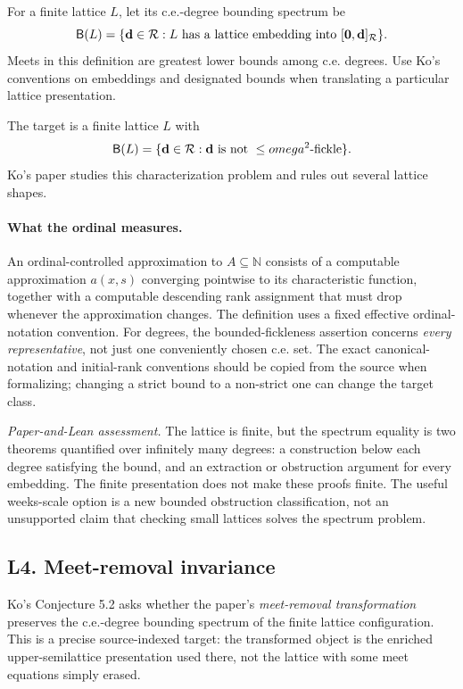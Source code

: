 \documentclass[11pt,a4paper]{article}
\newcommand{\N}{\mathbb N}
\newcommand{\R}{\mathcal R}
\newcommand{\zero}{\mathbf0}
\newcommand{\assessment}[1]{\par\noindent\textit{Paper-and-Lean assessment.} #1\par}
\theoremstyle{definition}\newtheorem{definition}[theorem]{Definition}
\theoremstyle{remark}\newtheorem{remark}[theorem]{Remark}
\begin{document}
For a finite lattice $L$, let its c.e.-degree bounding spectrum be
\[
 \mathsf B(L)=\{\ddeg\in\R:
       L\text{ has a lattice embedding into }[\zero,\ddeg]_{\R}\}.
\]
Meets in this definition are greatest lower bounds among c.e. degrees. Use Ko's conventions on embeddings and designated bounds when translating a particular lattice presentation.

The target is a finite lattice $L$ with
\[
 \mathsf B(L)=
 \{\ddeg\in\R:\ddeg\text{ is not }\leq\omega^2\text{-fickle}\}.
\]
Ko's paper studies this characterization problem and rules out several lattice shapes.\cite{Ko}

\paragraph{What the ordinal measures.}
An ordinal-controlled approximation to $A\subseteq\N$ consists of a computable approximation $a(x,s)$ converging pointwise to its characteristic function, together with a computable descending rank assignment that must drop whenever the approximation changes. The definition uses a fixed effective ordinal-notation convention. For degrees, the bounded-fickleness assertion concerns \emph{every representative}, not just one conveniently chosen c.e. set. The exact canonical-notation and initial-rank conventions should be copied from the source when formalizing; changing a strict bound to a non-strict one can change the target class.\cite[Section 1.1]{Ko}

\assessment{The lattice is finite, but the spectrum equality is two theorems quantified over infinitely many degrees: a construction below each degree satisfying the bound, and an extraction or obstruction argument for every embedding. The finite presentation does not make these proofs finite. The useful weeks-scale option is a new bounded obstruction classification, not an unsupported claim that checking small lattices solves the spectrum problem.}

\subsection{L4. Meet-removal invariance \Lmark}
\label{entry:L4}

Ko's Conjecture 5.2 asks whether the paper's \emph{meet-removal transformation} preserves the c.e.-degree bounding spectrum of the finite lattice configuration.\cite{Ko} This is a precise source-indexed target: the transformed object is the enriched upper-semilattice presentation used there, not the lattice with some meet equations simply erased.
\end{document}
